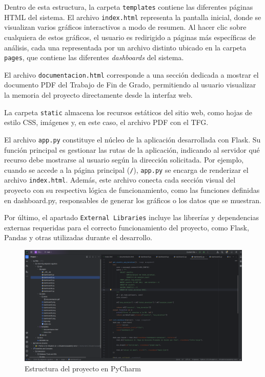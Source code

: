 \documentclass[a4paper, 12pt]{book}
\begin{document}
Dentro de esta estructura, la carpeta \texttt{templates} contiene las diferentes páginas HTML del sistema. El archivo \texttt{index.html} representa la pantalla inicial, donde se visualizan varios gráficos interactivos a modo de resumen. Al hacer clic sobre cualquiera de estos gráficos, el usuario es redirigido a páginas más específicas de análisis, cada una representada por un archivo distinto ubicado en la carpeta \texttt{pages}, que contiene las diferentes \textit{dashboards} del sistema.

El archivo \texttt{documentacion.html} corresponde a una sección dedicada a mostrar el documento PDF del Trabajo de Fin de Grado, permitiendo al usuario visualizar la memoria del proyecto directamente desde la interfaz web.

La carpeta \texttt{static} almacena los recursos estáticos del sitio web, como hojas de estilo CSS, imágenes y, en este caso, el archivo PDF con el TFG.

El archivo \texttt{app.py} constituye el núcleo de la aplicación desarrollada con Flask. Su función principal es gestionar las rutas de la aplicación, indicando al servidor qué recurso debe mostrarse al usuario según la dirección solicitada. Por ejemplo, cuando se accede a la página principal (\texttt{/}), \texttt{app.py} se encarga de renderizar el archivo \texttt{index.html}. Además, este archivo conecta cada sección visual del proyecto con su respectiva lógica de funcionamiento, como las funciones definidas en dashboard.py, responsables de generar los gráficos o los datos que se muestran.

Por último, el apartado \texttt{External Libraries} incluye las librerías y dependencias externas requeridas para el correcto funcionamiento del proyecto, como Flask, Pandas y otras utilizadas durante el desarrollo.

\begin{figure}[h!]
    \centering
    \includegraphics[width=1.1\textwidth]{img/pycharm.png}
    \caption{Estructura del proyecto en PyCharm}
    \label{fig:pycharm_project}
\end{figure}
\end{document}
